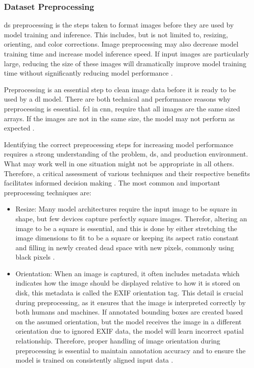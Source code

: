 \subsubsection{Dataset Preprocessing}
\gls{ds} preprocessing is the steps taken to format images before they are used by model training and inference. This includes, but is not limited to, resizing, orienting, and color corrections. Image preprocessing may also decrease model training time and increase model inference speed. If input images are particularly large, reducing the size of these images will dramatically improve model training time without significantly reducing model performance \cite{Preprocessing_Augmentation}.

Preprocessing is an essential step to clean image data before it is ready to be used by a \gls{dl} model. There are both technical and performance reasons why preprocessing is essential. \gls{fcl} in \gls{cnn}, require that all images are the same sized arrays. If the images are not in the same size, the model may not perform as expected \cite{Preprocessing_Augmentation}.

Identifying the correct preprocessing steps for increasing model performance requires a strong understanding of the problem, \gls{ds}, and production environment. What may work well in one situation might not be appropriate in all others. Therefore, a critical assessment of various techniques and their respective benefits facilitates informed decision making \cite{Preprocessing_Augmentation}. The most common and important preprocessing techniques are:
\begin{itemize}
    \item Resize: Many model architectures require the input image to be square in shape, but few devices capture perfectly square images. Therefor, altering an image to be a square is essential, and this is done by either stretching the image dimensions to fit to be a square or keeping its aspect ratio constant and filling in newly created dead space with new pixels, commonly using black pixels \cite{Preprocessing_Augmentation}.
    \item Orientation: When an image is captured, it often includes metadata which indicates how the image should be displayed relative to how it is stored on disk, this metadata is called the EXIF orientation tag. This detail is crucial during preprocessing, as it ensures that the image is interpreted correctly by both humans and machines. If annotated bounding boxes are created based on the assumed orientation, but the model receives the image in a different orientation due to ignored EXIF data, the model will learn incorrect spatial relationship. Therefore, proper handling of image orientation during preprocessing is essential to maintain annotation accuracy and to ensure the model is trained on consistently aligned input data \cite{Preprocessing_Augmentation}.
\end{itemize}


